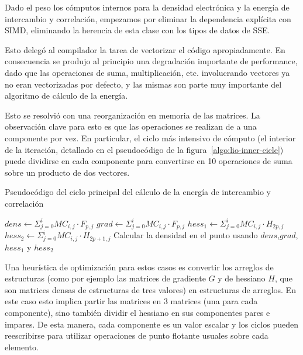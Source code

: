 Dado el peso los c\'omputos internos para la densidad electr\'onica y la energ\'ia
de intercambio y correlaci\'on, empezamos por eliminar la dependencia expl\'icita
con SIMD, eliminando la herencia de esta clase con los tipos de datos de SSE.

Esto deleg\'o al compilador la tarea de vectorizar el c\'odigo apropiadamente. En consecuencia
se produjo al principio una degradaci\'on importante de performance, dado que las operaciones
de suma, multiplicaci\'on, etc. involucrando vectores ya no eran vectorizadas por defecto, y
las mismas son parte muy importante del algoritmo de c\'alculo de la energ\'ia.

Esto se resolvi\'o con una reorganizaci\'on en memoria de las matrices. La observaci\'on clave
para esto es que las operaciones se realizan de a una componente por vez. En particular,
el ciclo m\'as intensivo de c\'omputo (el interior de la iteraci\'on, detallado en el pseudoc\'odigo
de la figura~\ref{algo:lio-inner-cicle}) puede dividirse
en cada componente para convertirse en 10 operaciones de suma sobre un producto de
dos vectores.

\begin{algorithm}[H]
        \caption{Pseudoc\'odigo del ciclo principal del c\'alculo de la energ\'ia de intercambio y correlaci\'on}
        \label{algo:lio-inner-cicle}
        \begin{algorithmic}
                     \State $dens \gets \Sigma_{j = 0}^{i} MC_{i,j} \cdot F_{p,j}$
                     \State $grad \gets \Sigma_{j = 0}^{i} MC_{i,j} \cdot F_{p,j}$
                     \State $hess_1 \gets \Sigma_{j = 0}^{i} MC_{i,j} \cdot H_{2p,j}$
                     \State $hess_2 \gets \Sigma_{j = 0}^{i} MC_{i,j} \cdot H_{2p+1,j}$
                  \EndFor
                  \State Calcular la densidad en el punto usando $dens$,$grad$,$hess_1$ y $hess_2$
              \EndFor
            \EndFunction
        \end{algorithmic}
\end{algorithm}

Una heur\'istica de optimizaci\'on para estos casos es convertir los arreglos de
estructuras (como por ejemplo las matrices de gradiente $G$ y de hessiano $H$, que
son matrices densas de estructuras de tres valores) en estructuras de arreglos.
En este caso esto implica partir las matrices en 3 matrices (una para cada
componente), sino tambi\'en dividir el hessiano en sus componentes pares e impares.
De esta manera, cada componente es un valor escalar y los ciclos pueden reescribirse
para utilizar operaciones de punto flotante usuales sobre cada elemento.

